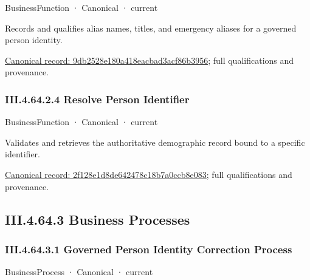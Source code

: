 \label{element:9db2528e180a418eacbad3acf86b3956}
{\small BusinessFunction · Canonical · current}\par

Records and qualifies alias names, titles, and emergency aliases for a governed person identity.


{\footnotesize \href{../../../../continuum/business/business-function/9db2528e180a418eacbad3acf86b3956.md}{Canonical record: 9db2528e180a418eacbad3acf86b3956}; full qualifications and provenance.}\par
\subsubsection*{III.4.64.2.4 Resolve Person Identifier}
\label{navigation:III.4.64.2.4}

\label{element:2f128e1d8de642478c18b7a0ccb8e083}
{\small BusinessFunction · Canonical · current}\par

Validates and retrieves the authoritative demographic record bound to a specific identifier.


{\footnotesize \href{../../../../continuum/business/business-function/2f128e1d8de642478c18b7a0ccb8e083.md}{Canonical record: 2f128e1d8de642478c18b7a0ccb8e083}; full qualifications and provenance.}\par
\subsection*{III.4.64.3 Business Processes}
\label{navigation:III.4.64.3}

\subsubsection*{III.4.64.3.1 Governed Person Identity Correction Process}
\label{navigation:III.4.64.3.1}

\label{element:72f3c63da45d44868579a3bb15d1568c}
{\small BusinessProcess · Canonical · current}\par


